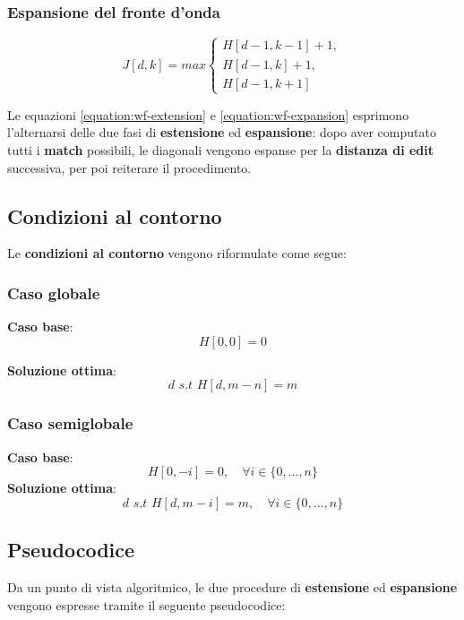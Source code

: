 \subsubsection{Espansione del fronte d'onda}
    \begin{equation}
        J[d, k] = max \begin{cases}
            H[d - 1, k - 1] + 1, \\
            H[d - 1, k] + 1, \\
            H[d - 1, k + 1]
        \end{cases}
    \label{equation:wf-expansion}
    \end{equation}

    Le equazioni \ref{equation:wf-extension} e \ref{equation:wf-expansion} esprimono l'alternarsi delle due fasi di \textbf{estensione} ed \textbf{espansione}: dopo aver computato tutti i \textbf{match} possibili, le diagonali vengono espanse per la \textbf{distanza di edit} successiva, per poi reiterare il procedimento.

\subsection{Condizioni al contorno}
    Le \textbf{condizioni al contorno} vengono riformulate come segue:

\subsubsection{Caso globale}
    \textbf{Caso base}:
    \begin{equation}
        H[0, 0] = 0
    \label{section:wfa_global_base_case}
    \end{equation}

    \textbf{Soluzione ottima}: $$d \, \, s.t \, \, H[d, m - n] = m$$
    
\subsubsection{Caso semiglobale}
    \textbf{Caso base}:
    \begin{equation}
        H[0, -i] = 0, \quad \forall i \in \{0, ..., n\} 
        \label{section:wfa_semiglobal_base_case}
    \end{equation}
    \textbf{Soluzione ottima}:
    $$d \, \, s.t \, \, H[d, m - i] = m, \quad \forall i \in \{0, ..., n\}$$

\subsection{Pseudocodice}
    Da un punto di vista algoritmico, le due procedure di \textbf{estensione} ed \textbf{espansione} vengono espresse tramite il seguente pseudocodice:
